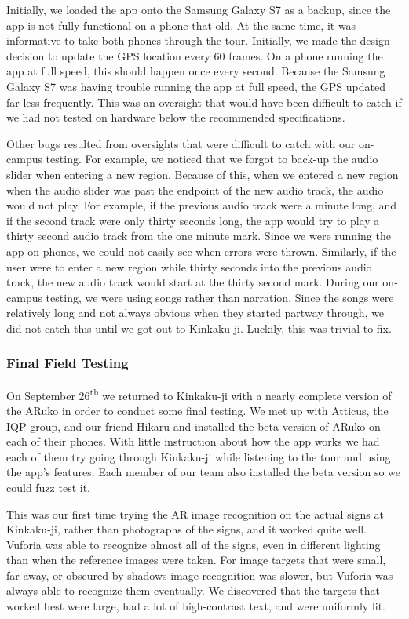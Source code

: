 \documentclass[a4paper, 10pt, american, titlepage]{article}
\begin{document}
Initially, we loaded the app onto the Samsung Galaxy S7 as a backup, since the
app is not fully functional on a phone that old. At the same time, it was
informative to take both phones through the tour. Initially, we made the design
decision to update the GPS location every 60 frames. On a phone running the app
at full speed, this should happen once every second. Because the Samsung Galaxy
S7 was having trouble running the app at full speed, the GPS updated far less
frequently. This was an oversight that would have been difficult to catch if we
had not tested on hardware below the recommended specifications.

Other bugs resulted from oversights that were difficult to catch with our
on-campus testing.  For example, we noticed that we forgot to back-up the audio
slider when entering a new region.  Because of this, when we entered a new
region when the audio slider was past the endpoint of the new audio track, the
audio would not play. For example, if the previous audio track were a minute
long, and if the second track were only thirty seconds long, the app would try
to play a thirty second audio track from the one minute mark. Since we were
running the app on phones, we could not easily see when errors were thrown.
Similarly, if the user were to enter a new region while thirty seconds into the
previous audio track, the new audio track would start at the thirty second
mark. During our on-campus testing, we were using songs rather than narration.
Since the songs were relatively long and not always obvious when they started
partway through, we did not catch this until we got out to Kinkaku-ji. Luckily,
this was trivial to fix.

\subsubsection{Final Field Testing}
\label{sec:finalFieldTesting}

On September 26\textsuperscript{th} we returned to Kinkaku-ji with a nearly
complete version of the ARuko in order to conduct some final testing. We met
up with Atticus, the IQP group, and our friend Hikaru and installed the beta
version of ARuko on each of their phones. With little instruction about how
the app works we had each of them try going through Kinkaku-ji while
listening to the tour and using the app's features. Each member of our team
also installed the beta version so we could fuzz test it.

This was our first time trying the AR image recognition on the actual signs
at Kinkaku-ji, rather than photographs of the signs, and it worked quite
well. Vuforia was able to recognize almost all of the signs, even in
different lighting than when the reference images were taken. For image
targets that were small, far away, or obscured by shadows image recognition
was slower, but Vuforia was always able to recognize them eventually. We
discovered that the targets that worked best were large, had a lot of
high-contrast text, and were uniformly lit.
\end{document}
